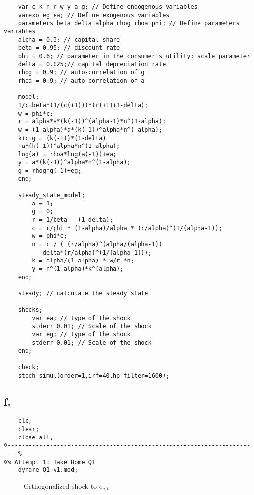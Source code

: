 \documentclass{article}
\begin{document}
\begin{lstlisting}
    var c k n r w y a g; // Define endogenous variables
    varexo eg ea; // Define exogenous variables
    parameters beta delta alpha rhog rhoa phi; // Define parameters variables
    alpha = 0.3; // capital share
    beta = 0.95; // discount rate
    phi = 0.6; // parameter in the consumer's utility: scale parameter
    delta = 0.025;// capital depreciation rate
    rhog = 0.9; // auto-correlation of g
    rhoa = 0.9; // auto-correlation of a
    
    model;
    1/c=beta*(1/(c(+1)))*(r(+1)+1-delta);
    w = phi*c; 
    r = alpha*a*(k(-1))^(alpha-1)*n^(1-alpha);
    w = (1-alpha)*a*(k(-1))^alpha*n^(-alpha);
    k+c+g = (k(-1))*(1-delta)
    +a*(k(-1))^alpha*n^(1-alpha);
    log(a) = rhoa*log(a(-1))+ea;
    y = a*(k(-1))^alpha*n^(1-alpha);
    g = rhog*g(-1)+eg;
    end;
    
    steady_state_model;
        a = 1;
        g = 0;
        r = 1/beta - (1-delta);
        c = r/phi * (1-alpha)/alpha * (r/alpha)^(1/(alpha-1));
        w = phi*c;
        n = c / ( (r/alpha)^(alpha/(alpha-1))
         - delta*(r/alpha)^(1/(alpha-1)));
        k = alpha/(1-alpha) * w/r *n;
        y = n^(1-alpha)*k^(alpha);
    end;
    
    steady; // calculate the steady state
    
    shocks;
        var ea; // type of the shock
        stderr 0.01; // Scale of the shock
        var eg; // type of the shock
        stderr 0.01; // Scale of the shock
    end;
    
    check;
    stoch_simul(order=1,irf=40,hp_filter=1600);
\end{lstlisting}

\subsection*{f.}

\begin{lstlisting}
    clc;
    clear;
    close all;
%-------------------------------------------------------------------------%
%% Attempt 1: Take Home Q1 
    dynare Q1_v1.mod;
\end{lstlisting}

\begin{figure}[H]
  \centering
  
  \caption{Orthogonalized shock to $e_{g,t}$}
  \label{fig:figure1}
\end{figure}
\end{document}
